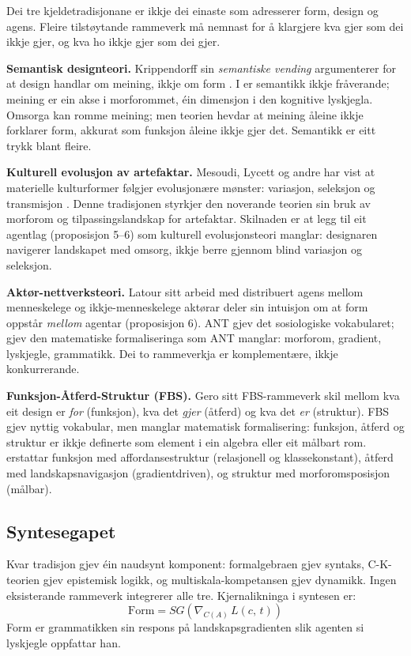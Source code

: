 Dei tre kjeldetradisjonane er ikkje dei einaste som adresserer form, design og agens. Fleire tilstøytande rammeverk må nemnast for å klargjere kva \formlaere{} gjer som dei ikkje gjer, og kva ho ikkje gjer som dei gjer.

\textbf{Semantisk designteori.} Krippendorff sin \textit{semantiske vending} argumenterer for at design handlar om meining, ikkje om form \parencite{Krippendorff2006}. I \formlaere{} er semantikk ikkje fråverande; meining er ein akse i morforommet, éin dimensjon i den kognitive lyskjegla. Omsorga kan romme meining; men teorien hevdar at meining åleine ikkje forklarer form, akkurat som funksjon åleine ikkje gjer det. Semantikk er eitt trykk blant fleire.

\textbf{Kulturell evolusjon av artefaktar.} Mesoudi, Lycett og andre har vist at materielle kulturformer følgjer evolusjonære mønster: variasjon, seleksjon og transmisjon \parencite{Mesoudi2011, Lycett2015}. Denne tradisjonen styrkjer den noverande teorien sin bruk av morforom og tilpassingslandskap for artefaktar. Skilnaden er at \formlaere{} legg til eit agentlag (proposisjon 5--6) som kulturell evolusjonsteori manglar: designaren navigerer landskapet med omsorg, ikkje berre gjennom blind variasjon og seleksjon.

\textbf{Aktør-nettverksteori.} Latour sitt arbeid med distribuert agens mellom menneskelege og ikkje-menneskelege aktørar \parencite{Latour2005} deler \formlaere{} sin intuisjon om at form oppstår \textit{mellom} agentar (proposisjon 6). ANT gjev det sosiologiske vokabularet; \formlaere{} gjev den matematiske formaliseringa som ANT manglar: morforom, gradient, lyskjegle, grammatikk. Dei to rammeverkja er komplementære, ikkje konkurrerande.

\textbf{Funksjon-Åtferd-Struktur (FBS).} Gero sitt FBS-rammeverk \parencite{Gero1990} skil mellom kva eit design er \textit{for} (funksjon), kva det \textit{gjer} (åtferd) og kva det \textit{er} (struktur). FBS gjev nyttig vokabular, men manglar matematisk formalisering: funksjon, åtferd og struktur er ikkje definerte som element i ein algebra eller eit målbart rom. \formlaere{} erstattar funksjon med affordansestruktur (relasjonell og klassekonstant), åtferd med landskapsnavigasjon (gradientdriven), og struktur med morforomsposisjon (målbar).

\subsection{Syntesegapet}

Kvar tradisjon gjev éin naudsynt komponent: formalgebraen gjev syntaks, C-K-teorien gjev epistemisk logikk, og multiskala-kompetansen gjev dynamikk. Ingen eksisterande rammeverk integrerer alle tre. Kjernalikninga i syntesen er:
\begin{equation*}
\mathrm{Form} = SG\!\left(\nabla_{C(A)}\, L(c,\, t)\right)
\end{equation*}
\noindent Form er grammatikken sin respons på landskapsgradienten slik agenten si lyskjegle oppfattar han.
